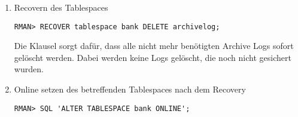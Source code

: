 \begin{enumerate}
            \item Recovern des Tablespaces
              \begin{lstlisting}[caption={Recovery des Tablespaces},label=admin1459,language=rman]
RMAN> RECOVER tablespace bank DELETE archivelog;
              \end{lstlisting}
              Die Klausel  sorgt dafür, dass alle nicht mehr benötigten Archive Logs sofort gelöscht werden. Dabei werden keine Logs gelöscht, die noch nicht gesichert wurden.
            \item Online setzen des betreffenden Tablespaces nach dem Recovery
              \begin{lstlisting}[caption={Betreffenden Tablespace Online setzen},label=admin1460,language=rman,emph={[10]ALTER,TABLESPACE,ONLINE},emphstyle={[10]\color{magenta}\bfseries}]
RMAN> SQL 'ALTER TABLESPACE bank ONLINE';
              \end{lstlisting}
          \end{enumerate}
